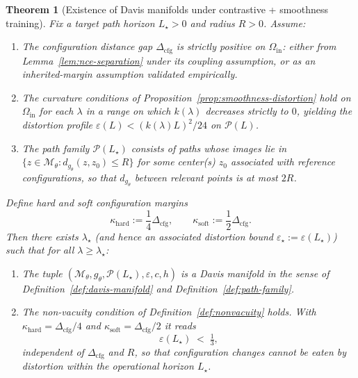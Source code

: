 \documentclass[11pt]{article}
\newtheorem{theorem}{Theorem}
\theoremstyle{remark}
\theoremstyle{plain}
\begin{document}
\begin{theorem}[Existence of Davis manifolds under contrastive + smoothness training]
\label{thm:existence}
Fix a target path horizon $L_\star > 0$ and radius $R>0$. Assume:
\begin{enumerate}[label=(D\arabic*),leftmargin=*]
  \item The configuration distance gap $\Delta_{\mathrm{cfg}}$ is strictly positive on $\Omega_{\mathrm{in}}$:
    either from Lemma~\ref{lem:nce-separation} under its coupling assumption, or as an inherited-margin
    assumption validated empirically.
  \item The curvature conditions of Proposition~\ref{prop:smoothness-distortion} hold on
    $\Omega_{\mathrm{in}}$ for each $\lambda$ in a range on which $k(\lambda)$ decreases strictly to $0$,
    yielding the distortion profile $\varepsilon(L) < (k(\lambda)L)^2/24$ on $\mathcal{P}(L)$.
  \item The path family $\mathcal{P}(L_\star)$ consists of paths whose images lie in
    $\{z \in \mathcal{M}_\theta : d_{g_\theta}(z,z_0) \le R\}$ for some center(s) $z_0$ associated
    with reference configurations, so that $d_{g_\theta}$ between relevant points is at most $2R$.
\end{enumerate}
Define hard and soft configuration margins
\[
\kappa_{\mathrm{hard}} := \frac{1}{4}\Delta_{\mathrm{cfg}},
\qquad
\kappa_{\mathrm{soft}} := \frac{1}{2}\Delta_{\mathrm{cfg}}.
\]
Then there exists $\lambda_\star$ (and hence an associated distortion bound
$\varepsilon_\star := \varepsilon(L_\star)$) such that for all $\lambda \ge \lambda_\star$:
\begin{enumerate}[label=(E\arabic*),leftmargin=*]
  \item The tuple
    $(\mathcal{M}_\theta, g_\theta, \mathcal{P}(L_\star), \varepsilon, c, h)$ is a Davis manifold in
    the sense of Definition~\ref{def:davis-manifold} and Definition~\ref{def:path-family}.
  \item The non-vacuity condition of Definition~\ref{def:nonvacuity} holds. With
    $\kappa_{\mathrm{hard}} = \Delta_{\mathrm{cfg}}/4$ and $\kappa_{\mathrm{soft}} = \Delta_{\mathrm{cfg}}/2$ it reads
    \[
      \varepsilon(L_\star) \;<\; \tfrac{1}{3},
    \]
    independent of $\Delta_{\mathrm{cfg}}$ and $R$, so that configuration changes cannot be eaten by distortion
    within the operational horizon $L_\star$.
\end{enumerate}
\end{theorem}
\end{document}
